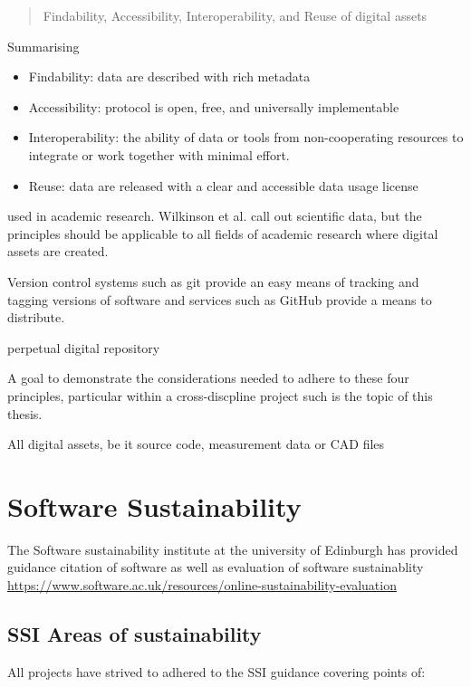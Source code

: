 \begin{quote}
Findability, Accessibility, Interoperability, and Reuse of digital assets    
\end{quote}

Summarising \cite{wilkinson_fair_2016}

\begin{itemize}
\item Findability: data are described with rich metadata
\item Accessibility: protocol is open, free, and universally implementable
\item Interoperability: the ability of data or tools from non-cooperating resources to integrate or work together with minimal effort.
\item Reuse: data are released with a clear and accessible data usage license
\end{itemize}

used in academic research. Wilkinson et al. call out scientific data, but the principles should be applicable to all fields of academic research where digital assets are created.

Version control systems such as git provide an easy means of tracking and tagging versions of software and services such as GitHub provide a means to distribute.

perpetual digital repository

A goal to demonstrate the considerations needed to adhere to these four principles, particular within a cross-discpline project such is the topic of this thesis.

All digital assets, be it source code, measurement data or CAD files

\section{Software Sustainability}

The Software sustainability institute at the university of Edinburgh has provided guidance citation \cite{hong_how_2019} of software as well as evaluation of software sustainablity \url{https://www.software.ac.uk/resources/online-sustainability-evaluation}

\subsection{SSI Areas of sustainability}

All projects have strived to adhered to the SSI guidance covering points of:

